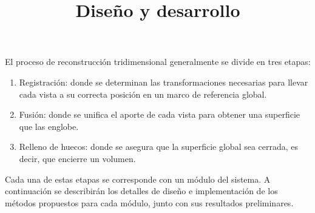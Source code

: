 \documentclass{pfc}
\title{Diseño y desarrollo}
\begin{document}
	\onecolumn
	\maketitle
	El proceso de reconstrucción tridimensional generalmente se divide en tres etapas:
	\begin{enumerate}
		\item Registración: donde se determinan las transformaciones necesarias
			para llevar cada vista a su correcta posición en un marco de
			referencia global.
		\item Fusión: donde se unifica el aporte de cada vista para obtener una
			superficie que las englobe.
		\item Relleno de huecos: donde se asegura que la superficie global sea
			cerrada, es decir, que encierre un volumen.
	\end{enumerate}
	Cada una de estas etapas se corresponde con un módulo del sistema.
	A continuación se describirán los detalles de diseño e implementación de
	los métodos propuestos para cada módulo, junto con sus resultados
	preliminares.

	\twocolumn
	
	
	
	\onecolumn
	
	
\end{document}
